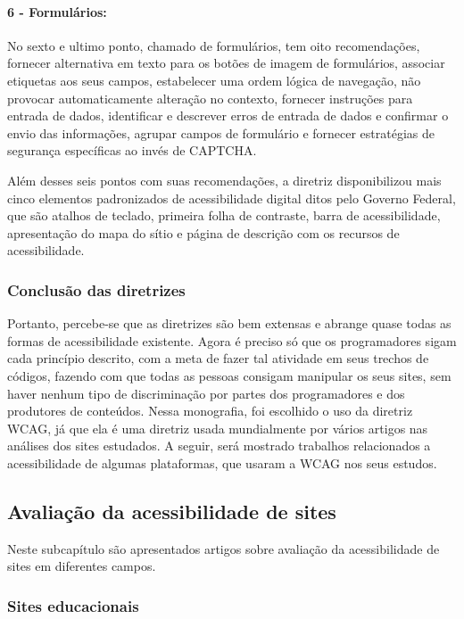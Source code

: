 \documentclass[a4paper]{article}
\begin{document}
\begin{titlepage}
\paragraph{6 - Formulários: }

No sexto e ultimo ponto, chamado de formulários, tem oito recomendações, fornecer alternativa em texto para os botões de imagem de formulários, associar etiquetas aos seus campos, estabelecer uma ordem lógica de navegação, não provocar automaticamente alteração no contexto, fornecer instruções para entrada de dados, identificar e descrever erros de entrada de dados e confirmar o envio das informações, agrupar campos de formulário e fornecer estratégias de segurança específicas ao invés de CAPTCHA.

Além desses seis pontos com suas recomendações, a diretriz disponibilizou mais cinco elementos padronizados de acessibilidade digital ditos pelo Governo Federal, que são atalhos de teclado, primeira folha de contraste, barra de acessibilidade, apresentação do mapa do sítio e página de descrição com os recursos de acessibilidade.

\subsubsection{Conclusão das diretrizes}

Portanto, percebe-se que as diretrizes são bem extensas e abrange quase todas as formas de acessibilidade existente. Agora é preciso só que os programadores sigam cada princípio descrito, com a meta de fazer tal atividade em seus trechos de códigos, fazendo com que todas as pessoas consigam manipular os seus sites, sem haver nenhum tipo de discriminação por partes dos programadores e dos produtores de conteúdos. Nessa monografia, foi escolhido o uso da diretriz WCAG, já que ela é uma diretriz usada mundialmente por vários artigos nas análises dos sites estudados. A seguir, será mostrado trabalhos relacionados a acessibilidade de algumas plataformas, que usaram a WCAG nos seus estudos.

\subsection{Avaliação da acessibilidade de sites}
Neste subcapítulo são apresentados artigos sobre avaliação da acessibilidade de sites em diferentes campos.

\subsubsection{Sites educacionais}


\end{titlepage}
\end{document}
